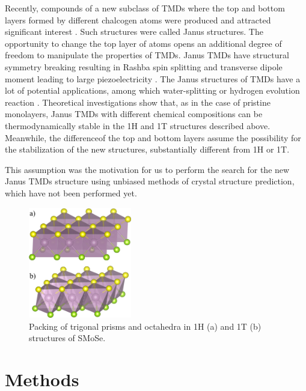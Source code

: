 \documentclass[a4paperm]{article}
\begin{document}
Recently, compounds of a new subclass of TMDs where the top and bottom layers formed by different chalcogen atoms were produced and attracted significant interest \cite{lu2017, zhang2017janus}. 
Such structures were called Janus structures.
The opportunity to change the top layer of atoms opens an additional degree of freedom to manipulate the properties of TMDs. 
Janus TMDs have structural symmetry breaking \cite{li2017electronic, van2020first} resulting in Rashba spin splitting \cite{hu2018intrinsic} and transverse dipole moment leading to large piezoelectricity \cite{dong2017large, li2018recent}. 
The Janus structures of TMDs have a lot of potential applications, among which water-splitting \cite{xia2018universality, ma2018janus} or hydrogen evolution reaction \cite{er2018prediction, zhou2019janus}. 
Theoretical investigations show that, as in the case of pristine monolayers, Janus TMDs with different chemical compositions can be thermodynamically stable in the 1H and 1T structures described above.
Meanwhile, the differenceof the top and bottom layers assume the possibility for the stabilization of the new structures, substantially different from 1H or 1T.

This assumption was the motivation for us to perform the search for the new Janus TMDs structure using unbiased methods of crystal structure prediction, which have not been performed yet.


\begin{figure}
        \includegraphics[width=0.4\textwidth]{1H1T.png}
        \caption{Packing of trigonal prisms and octahedra in 1H (a) and 1T (b) structures of SMoSe.}
\label{1H1T}
\end{figure}





		\section{Methods}
\end{document}
